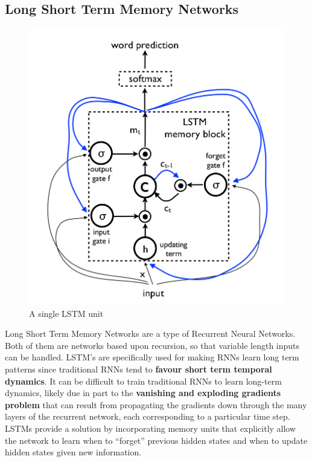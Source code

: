 \documentclass{article}
\begin{document}
			\subsection{Long Short Term Memory Networks}
			    \begin{figure}[ht!]
			    	\centering
					\includegraphics[scale=0.266]{LSTM_unit.png}
					\caption{A single LSTM unit\label{fig6}}
				\end{figure}
				Long Short Term Memory Networks are a type of Recurrent Neural Networks. Both of them are networks based upon recursion, so that variable length inputs can be handled. LSTM's are specifically used for making RNNs learn long term patterns since traditional RNNs tend to \textbf{favour short term temporal dynamics}. It can be difficult to train traditional RNNs to learn long-term dynamics, likely due in part to the \textbf{vanishing and exploding gradients problem} that can result from propagating the gradients down through the many layers of the recurrent network, each corresponding to a particular time step. LSTMs provide a solution by incorporating memory units that explicitly allow the network to learn when to ``forget'' previous hidden states and when to update hidden states given new information.\\
\end{document}

